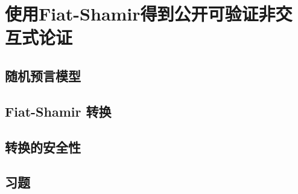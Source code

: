 \chapter{使用Fiat-Shamir得到公开可验证非交互式论证}\label{chp:05FS}

\section{随机预言模型} \label{5.1}
\section{Fiat-Shamir 转换} \label{5.2}
\section{转换的安全性} \label{5.3}
\section{习题} \label{5.4}

